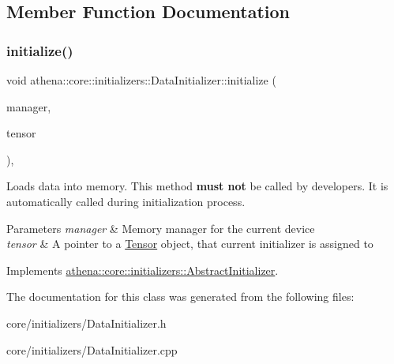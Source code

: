 \subsection{Member Function Documentation}
\mbox{\label{classathena_1_1core_1_1initializers_1_1_data_initializer_a984213526b2741e423f230098c71520a}} 
\subsubsection{\texorpdfstring{initialize()}{initialize()}}
{\footnotesize\ttfamily void athena\+::core\+::initializers\+::\+Data\+Initializer\+::initialize (\begin{DoxyParamCaption}\item[{\mbox{\hyperlink{classathena_1_1backend_1_1_abstract_memory_manager}{athena\+::backend\+::\+Abstract\+Memory\+Manager}} $\ast$}]{manager,  }\item[{\mbox{\hyperlink{classathena_1_1core_1_1_tensor}{Tensor}} $\ast$}]{tensor }\end{DoxyParamCaption})\hspace{0.3cm}{\ttfamily [override]}, {\ttfamily [virtual]}}

Loads data into memory. This method {\bfseries must not} be called by developers. It is automatically called during initialization process. 
\begin{DoxyParams}{Parameters}
{\em manager} & Memory manager for the current device \\
\hline
{\em tensor} & A pointer to a \mbox{\hyperlink{classathena_1_1core_1_1_tensor}{Tensor}} object, that current initializer is assigned to \\
\hline
\end{DoxyParams}


Implements \mbox{\hyperlink{classathena_1_1core_1_1initializers_1_1_abstract_initializer_a9c0f0c57add306c9da8ffe8797532f62}{athena\+::core\+::initializers\+::\+Abstract\+Initializer}}.



The documentation for this class was generated from the following files\+:\begin{DoxyCompactItemize}
\item 
core/initializers/Data\+Initializer.\+h\item 
core/initializers/Data\+Initializer.\+cpp\end{DoxyCompactItemize}
